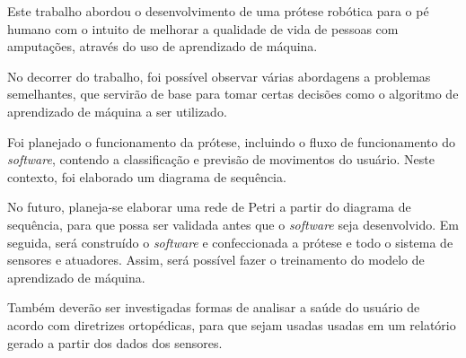 Este trabalho abordou o desenvolvimento de uma prótese robótica para o pé humano com o intuito de melhorar a qualidade de vida de pessoas com amputações, através do uso de aprendizado de máquina.

No decorrer do trabalho, foi possível observar várias abordagens a problemas semelhantes, que servirão de base para tomar certas decisões como o algoritmo de aprendizado de máquina a ser utilizado.

Foi planejado o funcionamento da prótese, incluindo o fluxo de funcionamento do \textit{software}, contendo a classificação e previsão de movimentos do usuário. Neste contexto, foi elaborado um diagrama de sequência.

No futuro, planeja-se elaborar uma rede de Petri a partir do diagrama de sequência, para que possa ser validada antes que o \textit{software} seja desenvolvido. Em seguida, será construído o \textit{software} e confeccionada a prótese e todo o sistema de sensores e atuadores. Assim, será possível fazer o treinamento do modelo de aprendizado de máquina.

Também deverão ser investigadas formas de analisar a saúde do usuário de acordo com diretrizes ortopédicas, para que sejam usadas usadas em um relatório gerado a partir dos dados dos sensores.